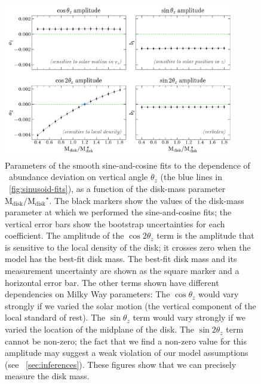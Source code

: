 \documentclass[modern]{aastex63}
\newcommand{\mdisk}{\ensuremath{\mathrm{M}_\mathrm{disk}}}
\newcommand{\mratio}{\ensuremath{\mdisk / \mdisk^\star}}
\begin{document}
\begin{figure}[!tp] %
  \begin{mdframed}[style=figure]
  \begin{center}
  \includegraphics[width=0.9\textwidth]{coeff-vs-mdisk.pdf}
  \end{center}
  \caption{%
    Parameters of the smooth sine-and-cosine fits to the dependence of \mgfe\
    abundance deviation on vertical angle $\theta_z$ (the blue lines in
    \figurename~\ref{fig:sinusoid-fits}), as a function of the disk-mass
    parameter \mratio.
    The black markers show the values of the disk-mass parameter at which we
    performed the sine-and-cosine fits; the vertical error bars show the
    bootstrap uncertainties for each coefficient.
    The amplitude of the $\cos 2\theta_z$ term is the amplitude that is
    sensitive to the local density of the disk; it crosses zero when the model
    has the best-fit disk mass.
    The best-fit disk mass and its measurement uncertainty are shown as the
    square marker and a horizontal error bar.
    The other terms shown have different dependencies on Milky Way parameters:
    The $\cos\theta_z$ would vary strongly if we varied the solar motion (the
    vertical component of the local standard of rest).
    The $\sin\theta_z$ term would vary strongly if we varied the location of the
    midplane of the disk.
    The $\sin 2\theta_z$ term cannot be non-zero; the fact that we find a
    non-zero value for this amplitude may suggest a weak violation of our model
    assumptions (see \sectionname~\ref{sec:inferences}).
    These figures show that we can precisely measure the disk mass.
  \label{fig:coeff-mdisk}
  }
  \end{mdframed}
\end{figure}
\end{document}
